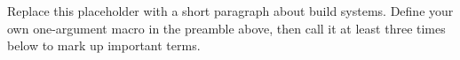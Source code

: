 \documentclass{article}
\begin{document}
Replace this placeholder with a short paragraph about build systems.
Define your own one-argument macro in the preamble above, then call it
at least three times below to mark up important terms.
\end{document}
